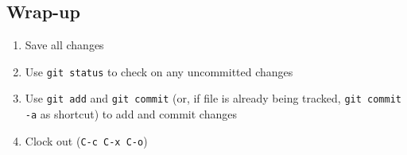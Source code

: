 \documentclass[11pt]{article}
\begin{document}
\subsection{Wrap-up}
\label{sec-4-7}

\begin{enumerate}
\item Save all changes
\item Use \texttt{git status} to check on any uncommitted changes
\item Use \texttt{git add} and \texttt{git commit} (or, if file is already being tracked, \texttt{git commit -a} as shortcut) to add and commit changes
\item Clock out (\texttt{C-c C-x C-o})
\end{enumerate}
\end{document}
